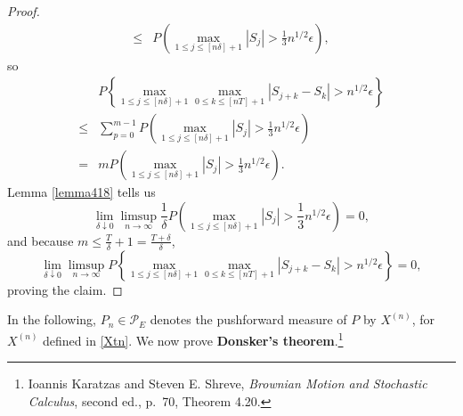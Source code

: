 \documentclass{article}
\theoremstyle{definition}
\begin{document}
\begin{proof}
\[\begin{split}
\leq&P\left(\max_{1 \leq j \leq [n\delta]+1} |S_j| > \frac{1}{3}n^{1/2}\epsilon\right),
\end{split}
\]
so
\[
\begin{split}
&P\left\{ \max_{1 \leq j \leq [n\delta]+1} \max_{0 \leq k \leq [nT]+1} |S_{j+k}-S_k| > n^{1/2} \epsilon\right\}\\
\leq&\sum_{p=0}^{m-1} P\left(\max_{1 \leq j \leq [n\delta]+1} |S_j| > \frac{1}{3}n^{1/2}\epsilon\right)\\
=&m P\left(\max_{1 \leq j \leq [n\delta]+1} |S_j| > \frac{1}{3}n^{1/2}\epsilon\right).
\end{split}
\]
 Lemma \ref{lemma418} tells us
 \[
\lim_{\delta \downarrow 0} \limsup_{n \to \infty} \frac{1}{\delta} P\left(\max_{1 \leq j \leq [n\delta]+1} |S_j| > \frac{1}{3}n^{1/2}\epsilon\right) = 0,
 \]
 and because $m \leq \frac{T}{\delta}+1 = \frac{T+\delta}{\delta}$, 
 \[
\lim_{\delta \downarrow 0} \limsup_{n \to \infty} P\left\{ \max_{1 \leq j \leq [n\delta]+1} \max_{0 \leq k \leq [nT]+1} |S_{j+k}-S_k| > n^{1/2} \epsilon\right\} = 0,
 \]
 proving the claim.
\end{proof}




In the following, $P_n \in \mathscr{P}_E$ denotes the pushforward measure of $P$ by $X^{(n)}$, for $X^{(n)}$ defined in \eqref{Xtn}.
We now prove \textbf{Donsker's theorem}.\footnote{Ioannis Karatzas and Steven E. Shreve,
{\em Brownian Motion and Stochastic Calculus}, second ed., p.~70, Theorem 4.20.}
\end{document}

